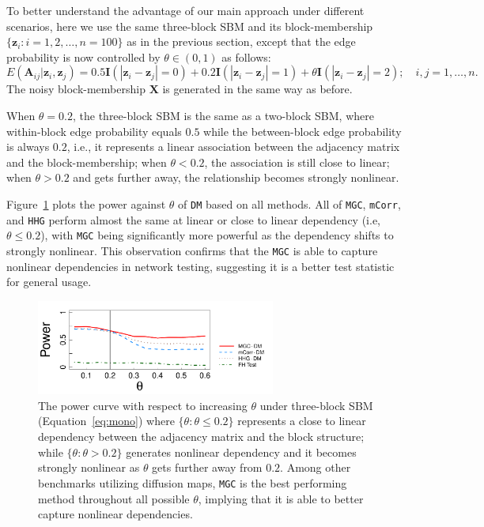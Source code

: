 \documentclass[12pt]{article}
\theoremstyle{definition}
\begin{document}
	To better understand the advantage of our main approach under different scenarios, here we use the same three-block SBM and its block-membership $\{ \mathbf{z}_{i} : i=1,2, \ldots, n=100 \}$ as in the previous section, except that the edge probability is now controlled by $\theta \in (0, 1)$ as follows:
	\begin{equation}
		E(\mathbf{A}_{ij} | \mathbf{z}_{i}, \mathbf{z}_{j}) = 0.5 \mathbf{I}(|\mathbf{z}_{i} - \mathbf{z}_{j}| = 0) + 0.2 \mathbf{I}(|\mathbf{z}_{i} - \mathbf{z}_{j}| = 1) + \theta \mathbf{I}(|\mathbf{z}_{i} - \mathbf{z}_{j}| = 2); \quad i,j = 1, \ldots, n.
		\label{eq:mono}
	\end{equation}
	The noisy block-membership $\mathbf{X}$ is generated in the same way as before.
	
	When $\theta = 0.2$, the three-block SBM is the same as a two-block SBM, where within-block edge probability equals $0.5$ while the between-block edge probability is always $0.2$, i.e., it represents a linear association between the adjacency matrix and the block-membership; when $\theta<0.2$, the association is still close to linear; when $\theta > 0.2$ and gets further away, the relationship becomes strongly nonlinear.
	
	Figure~\ref{fig:powerplot} plots the power against $\theta$ of \texttt{DM} based on all methods. All of \texttt{MGC}, \texttt{mCorr}, and \texttt{HHG} perform almost the same at linear or close to linear dependency (i.e, $\theta \leq 0.2$), with \texttt{MGC} being significantly more powerful as the dependency shifts to strongly nonlinear. This observation confirms that the \texttt{MGC} is able to capture nonlinear dependencies in network testing, suggesting it is a better test statistic for general usage.
	
	\begin{figure}[ht]
		\centering
		\includegraphics[width=0.7\textwidth]{../Figure/monoelbow3_t3.pdf}
		\caption{The power curve with respect to increasing $\theta$ under three-block SBM (Equation~\ref{eq:mono}) where $\{\theta : \theta \leq 0.2 \}$ represents a close to linear dependency between the adjacency matrix and the block structure; while $\{ \theta : \theta > 0.2 \}$ generates nonlinear dependency and it becomes strongly nonlinear as $\theta$ gets further away from $0.2$. Among other benchmarks utilizing diffusion maps, \texttt{MGC} is the best performing method throughout all possible $\theta$, implying that it is able to better capture nonlinear dependencies.}
		\label{fig:powerplot}
	\end{figure}
	
\end{document}
